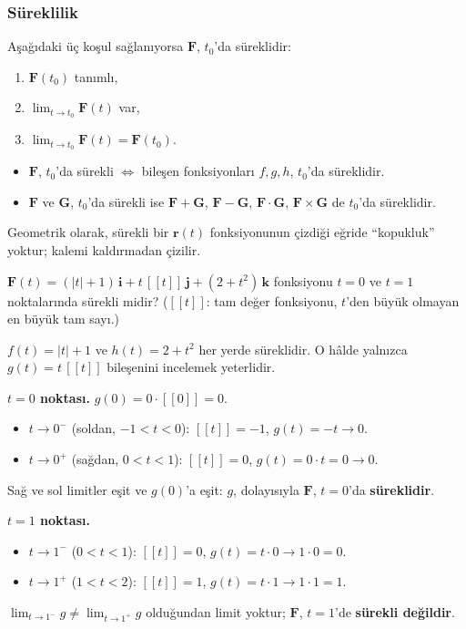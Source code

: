 \subsubsection{Süreklilik}

\begin{tanim}[Süreklilik]
Aşağıdaki üç koşul sağlanıyorsa $\mathbf F$, $t_0$'da süreklidir:
\begin{enumerate}
\item $\mathbf F(t_0)$ tanımlı,
\item $\lim_{t\to t_0}\mathbf F(t)$ var,
\item $\lim_{t\to t_0}\mathbf F(t)=\mathbf F(t_0)$.
\end{enumerate}
\end{tanim}

\begin{teorem}
\begin{itemize}
\item $\mathbf F$, $t_0$'da sürekli $\iff$ bileşen fonksiyonları $f,g,h$, $t_0$'da süreklidir.
\item $\mathbf F$ ve $\mathbf G$, $t_0$'da sürekli ise $\mathbf F+\mathbf G$, $\mathbf F-\mathbf G$, $\mathbf F\cdot\mathbf G$,
$\mathbf F\times\mathbf G$ de $t_0$'da süreklidir.
\end{itemize}
\end{teorem}

Geometrik olarak, sürekli bir $\mathbf r(t)$ fonksiyonunun çizdiği eğride ``kopukluk'' yoktur; kalemi kaldırmadan çizilir.

\begin{soru}
$\mathbf F(t)=(|t|+1)\,\mathbf i+t\,[\![t]\!]\,\mathbf j+(2+t^2)\,\mathbf k$ fonksiyonu $t=0$ ve $t=1$ noktalarında sürekli midir?
($[\![t]\!]$: tam değer fonksiyonu, $t$'den büyük olmayan en büyük tam sayı.)
\end{soru}
\begin{cevap}
$f(t)=|t|+1$ ve $h(t)=2+t^2$ her yerde süreklidir. O hâlde yalnızca $g(t)=t\,[\![t]\!]$ bileşenini incelemek yeterlidir.

\textbf{$t=0$ noktası.} $g(0)=0\cdot[\![0]\!]=0$.
\begin{itemize}
\item $t\to0^-$ (soldan, $-1<t<0$): $[\![t]\!]=-1$, $g(t)=-t\to0$.
\item $t\to0^+$ (sağdan, $0<t<1$): $[\![t]\!]=0$, $g(t)=0\cdot t=0\to0$.
\end{itemize}
Sağ ve sol limitler eşit ve $g(0)$'a eşit: $g$, dolayısıyla $\mathbf F$, $t=0$'da \textbf{süreklidir}.

\textbf{$t=1$ noktası.}
\begin{itemize}
\item $t\to1^-$ ($0<t<1$): $[\![t]\!]=0$, $g(t)=t\cdot0\to 1\cdot0=0$.
\item $t\to1^+$ ($1<t<2$): $[\![t]\!]=1$, $g(t)=t\cdot1\to1\cdot1=1$.
\end{itemize}
$\lim_{t\to1^-}g\neq\lim_{t\to1^+}g$ olduğundan limit yoktur; $\mathbf F$, $t=1$'de \textbf{sürekli değildir}.
\end{cevap}

